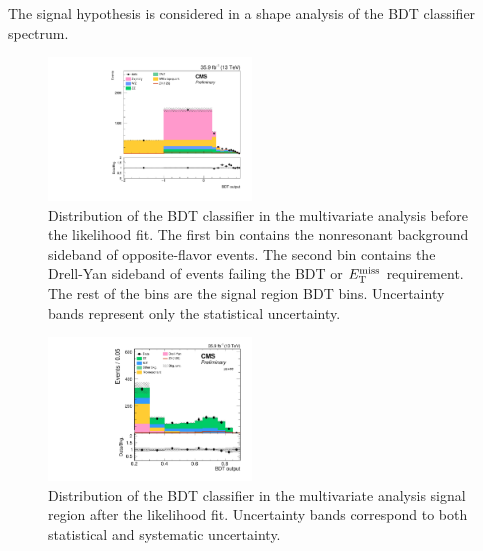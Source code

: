 The signal hypothesis is considered in a shape analysis of the BDT classifier spectrum. 

\begin{figure}[htbp]
\begin{center}
\includegraphics[width=0.48\textwidth]{figures/bdt_zh_prefit.pdf}
\caption{Distribution of the BDT classifier in the multivariate analysis before the likelihood fit. The first bin contains the nonresonant background sideband of opposite-flavor events. The second bin contains the Drell-Yan sideband of events failing the BDT or $E_\mathrm{T}^{\mathrm{miss}}$ requirement. The rest of the bins are the signal region BDT bins. Uncertainty bands represent only the statistical uncertainty.}
\label{fig:bdt_zh_prefit}
\end{center}
\end{figure}

\begin{figure}[htbp]
\begin{center}
\includegraphics[width=0.48\textwidth]{figures/fullsel_bdt_ll_postfit.pdf}
\caption{Distribution of the BDT classifier in the multivariate analysis signal region after the likelihood fit. Uncertainty bands correspond to both statistical and systematic uncertainty.}
\label{fig:bdt_zh}
\end{center}
\end{figure}

